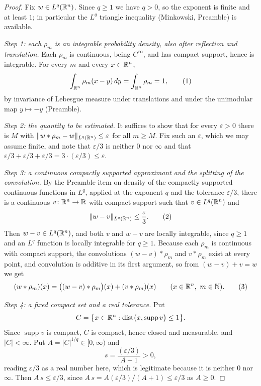 \begin{proof}
Fix $w\in L^q(\mathbb{R}^n)$.  Since $q\ge1$ we have $q>0$, so the exponent is finite
and at least $1$; in particular the $L^q$ triangle inequality (Minkowski,
Preamble) is available.

\emph{Step 1: each $\rho_m$ is an integrable probability density, also after
reflection and translation.}  Each $\rho_m$ is continuous, being $C^\infty$, and
has compact support, hence is integrable.  For every $m$ and every $x\in\mathbb{R}^n$,
\[
\int_{\mathbb{R}^n}\rho_m(x-y)\,dy=\int_{\mathbb{R}^n}\rho_m=1 ,
\tag{1}
\]
by invariance of Lebesgue measure under translations and under the unimodular
map $y\mapsto-y$ (Preamble).

\emph{Step 2: the quantity to be estimated.}  It suffices to show that for every
$\varepsilon>0$ there is $M$ with
$\|w*\rho_m-w\|_{L^q(\mathbb{R}^n)}\le\varepsilon$ for all $m\ge M$.  Fix such an
$\varepsilon$, which we may assume finite, and note that $\varepsilon/3$ is
neither $0$ nor $\infty$ and that
$\varepsilon/3+\varepsilon/3+\varepsilon/3=3\cdot(\varepsilon/3)\le\varepsilon$.

\emph{Step 3: a continuous compactly supported approximant and the splitting of
the convolution.}  By the Preamble item on density of the compactly supported
continuous functions in $L^q$, applied at the exponent $q$ and the tolerance
$\varepsilon/3$, there is a continuous $v\colon\mathbb{R}^n\to\mathbb{R}$ with compact support
such that $v\in L^q(\mathbb{R}^n)$ and
\[
\|w-v\|_{L^q(\mathbb{R}^n)}\le\frac\varepsilon3 .
\tag{2}
\]
Then $w-v\in L^q(\mathbb{R}^n)$, and both $v$ and $w-v$ are locally integrable, since
$q\ge1$ and an $L^q$ function is locally integrable for $q\ge1$.  Because each
$\rho_m$ is continuous with compact support, the convolutions $(w-v)*\rho_m$ and
$v*\rho_m$ exist at every point, and convolution is additive in its first
argument, so from $(w-v)+v=w$ we get
\[
(w*\rho_m)(x)=\bigl((w-v)*\rho_m\bigr)(x)+(v*\rho_m)(x)
\qquad(x\in\mathbb{R}^n,\ m\in\mathbb{N}).
\tag{3}
\]

\emph{Step 4: a fixed compact set and a real tolerance.}  Put
\[
C=\bigl\{x\in\mathbb{R}^n:\operatorname{dist}\bigl(x,\operatorname{supp}v\bigr)\le1\bigr\} .
\]
Since $\operatorname{supp}v$ is compact, $C$ is compact, hence closed and
measurable, and $|C|<\infty$.  Put $A=|C|^{1/q}\in[0,\infty)$ and
\[
s=\frac{(\varepsilon/3)}{A+1}>0 ,
\]
reading $\varepsilon/3$ as a real number here, which is legitimate because it is
neither $0$ nor $\infty$.  Then $A\,s\le\varepsilon/3$, since
$A\,s=A(\varepsilon/3)/(A+1)\le\varepsilon/3$ as $A\ge0$.


\end{proof}
